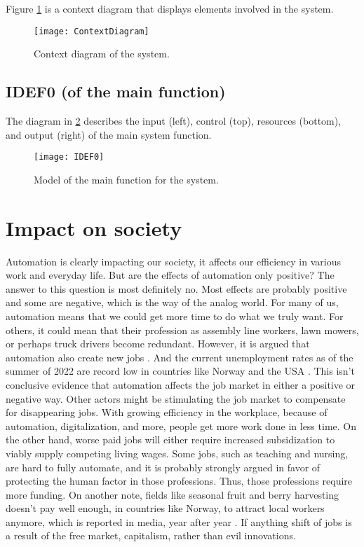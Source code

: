 \documentclass[%
oneside,    %
project,    %
nosummary   %
]{USN-MSc}
\begin{document}
Figure \ref{fig:contextDiagram} is a context diagram that displays elements involved in the system.

\begin{figure}[!ht]
  \centering
 \texttt{[image: ContextDiagram]}
 \caption{Context diagram of the system.}
 \label{fig:contextDiagram}
\end{figure}

\section{IDEF0 (of the main function)}
\label{sec:IDEF0}

The diagram in \ref{fig:idef0} describes the input (left), control (top), resources (bottom), and output (right) of the main system function.

\begin{figure}[!ht]
  \centering
 \texttt{[image: IDEF0]}
 \caption{Model of the main function for the system.}
 \label{fig:idef0}
\end{figure}

\chapter{Impact on society}
\label{ch:impact}

Automation is clearly impacting our society, it affects our efficiency in various work and everyday life.
But are the effects of automation only positive? The answer to this question is most definitely no.
Most effects are probably positive and some are negative, which is the way of the analog world.
For many of us, automation means that we could get more time to do what we truly want.
For others, it could mean that their profession as assembly line workers, lawn mowers, or perhaps truck drivers become redundant.
However, it is argued that automation also create new jobs \cite{CERNETIC2002167}.
And the current unemployment rates as of the summer of 2022 are record low in countries like Norway \cite{Lavestea6:online} and the USA \cite{Theunemp77:online}.
This isn't conclusive evidence that automation affects the job market in either a positive or negative way.
Other actors might be stimulating the job market to compensate for disappearing jobs.
With growing efficiency in the workplace, because of automation, digitalization, and more, people get more work done in less time.
On the other hand, worse paid jobs will either require increased subsidization to viably supply competing living wages.
Some jobs, such as teaching and nursing, are hard to fully automate, and it is probably strongly argued in favor of protecting the human factor in those professions.
Thus, those professions require more funding. On another note, 
fields like seasonal fruit and berry harvesting doesn't pay well enough,
in countries like Norway, to attract local workers anymore, 
which is reported in media, year after year \cite{Toavtrej43:online}.
If anything shift of jobs is a result of the free market, capitalism, rather than evil innovations.
\end{document}

